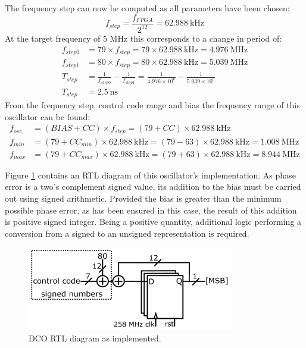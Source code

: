 The frequency step can now be computed as all parameters have been chosen:
\begin{equation}
f_{step} = \frac{f_{FPGA}}{2^{12}} = 62.988~\si{\kilo\hertz}
\end{equation}
At the target frequency of 5 MHz this corresponds to a change in period of:
\begin{align}
f_{step0} &= 79 \times f_{step} = 79 \times 62.988~\si{\kilo\hertz} = 4.976~\si{\mega\hertz} \\
f_{step1} &= 80 \times f_{step} = 80 \times 62.988~\si{\kilo\hertz} = 5.039~\si{\mega\hertz} \\
T_{step}  &= \frac{1}{f_{step0}} - \frac{1}{f_{step1}} = \frac{1}{4.976\times 10^6} - \frac{1}{5.039\times 10^6} \\
T_{step}  &= 2.5~\si{\nano\second}
\end{align}
From the frequency step, control code range and bias the frequency range of this oscillator can be found:
\begin{align}
f_{osc} &= (BIAS+CC)\times f_{step} = (79+CC)\times 62.988~\si{\kilo\hertz}\\
f_{min} &= (79+CC_{min})\times 62.988~\si{\kilo\hertz} = (79-63)\times 62.988~\si{\kilo\hertz} = 1.008~\si{\mega\hertz}\\
f_{max} &= (79+CC_{max})\times 62.988~\si{\kilo\hertz} = (79+63)\times 62.988~\si{\kilo\hertz} = 8.944~\si{\mega\hertz}
\end{align}

Figure \ref{fig:osc2_impl} contains an \ac{RTL} diagram of this oscillator's implementation. As phase error is a two's complement signed value, its addition to the bias must be carried out using signed arithmetic. Provided the bias is greater than the minimum possible phase error, as has been ensured in this case, the result of this addition is positive signed integer. Being a positive quantity, additional logic performing a conversion from a signed to an unsigned representation is required.
\begin{figure}[h]%
	\centering
	\includegraphics[width=0.8\textwidth]{../osc2_impl} 
	\caption[\ac{DCO} \ac{RTL} diagram as implemented]{\ac{DCO} \ac{RTL} diagram as implemented.}
	\label{fig:osc2_impl}
\end{figure}

